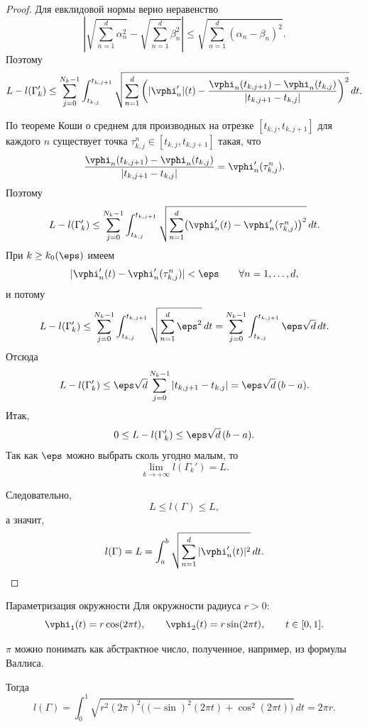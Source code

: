 \begin{proof}
	Для евклидовой нормы верно неравенство
	\[
	\left|
	\sqrt{\sum_{n=1}^d \alpha_n^2}
	-
	\sqrt{\sum_{n=1}^d \beta_n^2}
	\right|
	\le
	\sqrt{\sum_{n=1}^d (\alpha_n-\beta_n)^2}.
	\]
	Поэтому
	\[
	L-l(\Gamma_k')
	\le
	\sum_{j=0}^{N_k-1}
	\int_{t_{k,j}}^{t_{k,j+1}}
	\sqrt{
		\sum_{n=1}^d
		\left(
		|\vphi_n'|(t)
		-
		\frac{\vphi_n(t_{k,j+1})-\vphi_n(t_{k,j})}{|t_{k,j+1}-t_{k,j}|}
		\right)^2
	}\,dt.
	\]
	
	По теореме Коши о среднем для производных на отрезке $[t_{k,j},t_{k,j+1}]$ для каждого $n$ существует точка $\tau_{k,j}^n\in[t_{k,j},t_{k,j+1}]$ такая, что
	\[
	\frac{\vphi_n(t_{k,j+1})-\vphi_n(t_{k,j})}{|t_{k,j+1}-t_{k,j}|}
	=
	\vphi_n'(\tau_{k,j}^n).
	\]
	Поэтому
	\[
	L-l(\Gamma_k')
	\le
	\sum_{j=0}^{N_k-1}
	\int_{t_{k,j}}^{t_{k,j+1}}
	\sqrt{
		\sum_{n=1}^d
		\bigl(\vphi_n'(t)-\vphi_n'(\tau_{k,j}^n)\bigr)^2
	}\,dt.
	\]
	При $k\ge k_0(\eps)$ имеем
	\[
	|\vphi_n'(t)-\vphi_n'(\tau_{k,j}^n)|<\eps
	\qquad
	\forall n=1,\ldots,d,
	\]
	и потому
	\[
	L-l(\Gamma_k')
	\le
	\sum_{j=0}^{N_k-1}
	\int_{t_{k,j}}^{t_{k,j+1}}
	\sqrt{\sum_{n=1}^d \eps^2}\,dt
	=
	\sum_{j=0}^{N_k-1}
	\int_{t_{k,j}}^{t_{k,j+1}} \eps\sqrt{d}\,dt.
	\]
	Отсюда
	\[
	L-l(\Gamma_k')
	\le
	\eps\sqrt{d}\sum_{j=0}^{N_k-1} |t_{k,j+1}-t_{k,j}|
	=
	\eps\sqrt{d}\,(b-a).
	\]
	Итак,
	\[
	0\le L-l(\Gamma_k')\le \eps\sqrt{d}\,(b-a).
	\]
	Так как $\eps$ можно выбрать сколь угодно малым, то
	\[
	\lim_{k\to+\infty} l(\Gamma_k')=L.
	\]
	
	Следовательно,
	\[
	L\le l(\Gamma)\le L,
	\]
	а значит,
	\[
	l(\Gamma)=L=\int_a^b \sqrt{\sum_{n=1}^d |\vphi_n'(t)|^2}\,dt.
	\]
\end{proof}

\begin{Example}{Параметризация окружности}{}
	Для окружности радиуса $r>0$:
	\[
	\vphi_1(t)=r\cos(2\pi t),
	\qquad
	\vphi_2(t)=r\sin(2\pi t),
	\qquad
	t\in[0,1].
	\]
	
	$\pi$ можно понимать как абстрактное число, полученное, например, из формулы Валлиса.
	
	Тогда
	\[
	l(\Gamma)
	=
	\int_0^1
	\sqrt{
		r^2(2\pi)^2\bigl((-\sin)^2(2\pi t)+\cos^2(2\pi t)\bigr)
	}\,dt
	=
	2\pi r.
	\]
\end{Example}